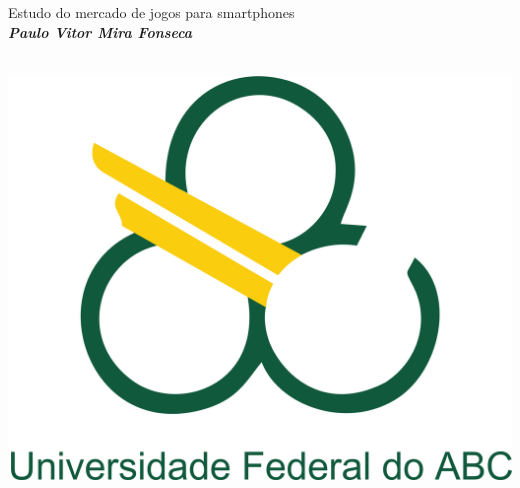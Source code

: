 
\ \vfill
\begin{center}
\begin{minipage}[c]{10cm}
\begin{center}
\hrulefill\\
\vspace{.5cm} {\Large\sf Estudo do mercado de jogos para smartphones}\\
\vspace{1.3cm}
\textbf{\large\textit{Paulo Vitor Mira Fonseca}}\\
\vspace{.5cm}
\hrulefill\\
\end{center}
\end{minipage}
\end{center}
\vfill

\begin{center}
\includegraphics[width=.25\textwidth]{logo-ufabc.png}
\end{center}

\cleardoublepage
